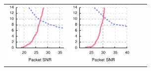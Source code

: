 \begin{figure}[p]
\begin{leftfullpage}
\begin{tabular}{cccc}
	\includegraphics[height=1.2in]{figures/delivery_figures/goodbad/packet_snr_goodbad_14.pdf} &
	\includegraphics[height=1.2in]{figures/delivery_figures/goodbad/packet_snr_goodbad_15.pdf} \\


\end{tabular}
\end{leftfullpage}
\end{figure}
